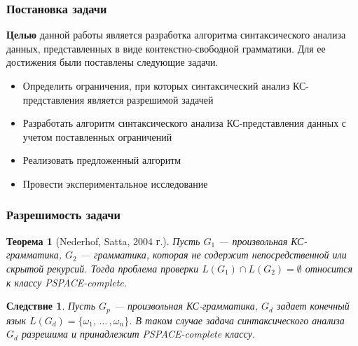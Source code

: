 \documentclass{beamer}
\newtheorem{rutheorem}{Теорема}
\newtheorem{coroll}[theorem]{Следствие}
\begin{document}
\begin{frame}
  \transwipe[direction=90]
  \frametitle{Постановка задачи}
	\textbf{Целью} данной работы является разработка алгоритма синтаксического анализа данных, представленных в виде контекстно-свободной грамматики. Для ее достижения были поставлены следующие задачи.
	\begin{itemize}
		\item Определить ограничения, при которых синтаксический анализ КС-представления является разрешимой задачей
		\item Разработать алгоритм синтаксического анализа КС-представления данных с учетом поставленных ограничений
		\item Реализовать предложенный алгоритм
		\item Провести экспериментальное исследование
	\end{itemize}
\end{frame}

\begin{frame}
	\transwipe[direction=90]
	\frametitle{Разрешимость задачи}
	\begin{rutheorem}[Nederhof, Satta, 2004 г.]
		Пусть $G_1$ --- произвольная КС-грамматика, $G_2$ --- грамматика, которая не содержит непосредственной или скрытой рекурсий. Тогда проблема проверки $L(G_1) \cap L(G_2) = \emptyset$ относится к классу PSPACE-complete.
	\end{rutheorem}
	\begin{coroll}
		Пусть $G_p$ --- произвольная КС-грамматика, $G_d$ задает конечный язык $L(G_d) = \{\omega_1, \, \dots \, , \omega_n \}$. В таком случае задача синтаксического анализа $G_d$ разрешима и принадлежит PSPACE-complete классу.
	\end{coroll}
\end{frame}
\end{document}
